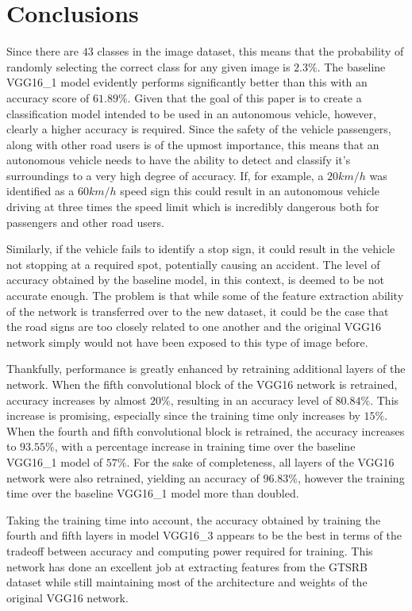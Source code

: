 \documentclass[a4paper,11pt]{article}
\begin{document}
\section{Conclusions}

Since there are $43$ classes in the image dataset, this means that the probability of randomly selecting the correct class for any given image is $2.3\%$. The baseline VGG16\_1 model evidently performs significantly better than this with an accuracy score of $61.89\%$. Given that the goal of this paper is to create a classification model intended to be used in an autonomous vehicle, however, clearly a higher accuracy is required. Since the safety of the vehicle passengers, along with other road users is of the upmost importance, this means that an autonomous vehicle needs to have the ability to detect and classify it's surroundings to a very high degree of accuracy. If, for example, a $20km/h$ was identified as a $60km/h$ speed sign this could result in an autonomous vehicle driving at three times the speed limit which is incredibly dangerous both for passengers and other road users.

Similarly, if the vehicle fails to identify a stop sign, it could result in the vehicle not stopping at a required spot, potentially causing an accident. The level of accuracy obtained by the baseline model, in this context, is deemed to be not accurate enough. The problem is that while some of the feature extraction ability of the network is transferred over to the new dataset, it could be the case that the road signs are too closely related to one another and the original VGG16 network simply would not have been exposed to this type of image before. 

Thankfully, performance is greatly enhanced by retraining additional layers of the network. When the fifth convolutional block of the VGG16 network is retrained, accuracy increases by almost $20\%$, resulting in an accuracy level of $80.84\%$. This increase is promising, especially since the training time only increases by $15\%$. When the fourth and fifth convolutional block is retrained, the accuracy increases to $93.55\%$, with a percentage increase in training time over the baseline VGG16\_1 model of $57\%$. For the sake of completeness, all layers of the VGG16 network were also retrained, yielding an accuracy of $96.83\%$, however the training time over the baseline VGG16\_1 model more than doubled.

Taking the training time into account, the accuracy obtained by training the fourth and fifth layers in model VGG16\_3 appears to be the best in terms of the tradeoff between accuracy and computing power required for training. This network has done an excellent job at extracting features from the GTSRB dataset while still maintaining most of the architecture and weights of the original VGG16 network. 
\end{document}
